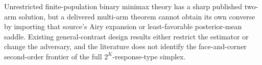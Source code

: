 Unrestricted finite-population binary minimax theory has a sharp published two-arm solution, but a delivered multi-arm theorem cannot obtain its own converse by importing that source's Airy expansion or least-favorable posterior-mean saddle. Existing general-contrast design results either restrict the estimator or change the adversary, and the literature does not identify the face-and-corner second-order frontier of the full \(2^K\)-response-type simplex.